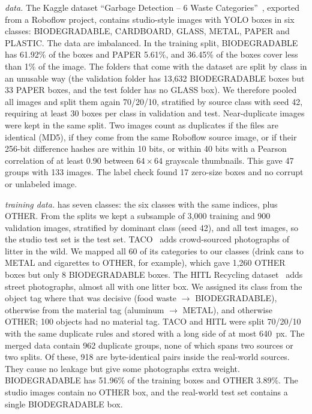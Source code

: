 \textit{\genone data.} The Kaggle dataset ``Garbage Detection -- 6 Waste Categories''~\cite{viswaprakash2024garbage}, exported from a Roboflow project, contains studio-style images with YOLO boxes in six classes: BIODEGRADABLE, CARDBOARD, GLASS, METAL, PAPER and PLASTIC. The data are imbalanced. In the training split, BIODEGRADABLE has 61.92\% of the boxes and PAPER 5.61\%, and 36.45\% of the boxes cover less than 1\% of the image. The folders that come with the dataset are split by class in an unusable way (the validation folder has 13,632 BIODEGRADABLE boxes but 33 PAPER boxes, and the test folder has no GLASS box). We therefore pooled all images and split them again 70/20/10, stratified by source class with seed 42, requiring at least 30 boxes per class in validation and test. Near-duplicate images were kept in the same split. Two images count as duplicates if the files are identical (MD5), if they come from the same Roboflow source image, or if their 256-bit difference hashes are within 10 bits, or within 40 bits with a Pearson correlation of at least 0.90 between $64\times64$ grayscale thumbnails. This gave 47 groups with 133 images. The label check found 17 zero-size boxes and no corrupt or unlabeled image.

\textit{\gentwo training data.} \gentwo has seven classes: the six \genone classes with the same indices, plus OTHER. From the \genone splits we kept a subsample of 3,000 training and 900 validation images, stratified by dominant class (seed 42), and all test images, so the \gentwo studio test set is the \genone test set. TACO~\cite{proenca2020taco} adds crowd-sourced photographs of litter in the wild. We mapped all 60 of its categories to our classes (drink cans to METAL and cigarettes to OTHER, for example), which gave 1,260 OTHER boxes but only 8 BIODEGRADABLE boxes. The HITL Recycling dataset~\cite{hitl2026recycling} adds street photographs, almost all with one litter box. We assigned its class from the object tag where that was decisive (food waste $\to$ BIODEGRADABLE), otherwise from the material tag (aluminum $\to$ METAL), and otherwise OTHER; 100 objects had no material tag. TACO and HITL were split 70/20/10 with the same duplicate rules and stored with a long side of at most 640~px. The merged data contain 962 duplicate groups, none of which spans two sources or two splits. Of these, 918 are byte-identical pairs inside the real-world sources. They cause no leakage but give some photographs extra weight. BIODEGRADABLE has 51.96\% of the training boxes and OTHER 3.89\%. The studio images contain no OTHER box, and the real-world test set contains a single BIODEGRADABLE box.

